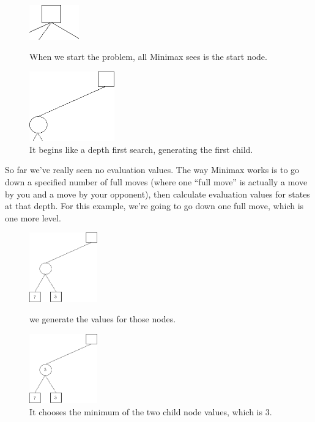 \begin{figure}[H]
\centering
	\begin{minipage}[b]{0.45\linewidth}
		\centering
		\includegraphics[height=1.5cm]{2_State_of_the_art/Arimaa_on_MCTS_Benoit/img/Minimax2.png}
		\caption{\label{fig:Minimax2}When we start the problem, all Minimax sees is the start node.}
	\end{minipage}%
	\hspace*{1cm}
	\begin{minipage}[b]{0.45\linewidth}
		\centering
		\includegraphics[height=3cm]{2_State_of_the_art/Arimaa_on_MCTS_Benoit/img/Minimax3.png}
		\caption{\label{fig:Minimax3}It begins like a depth first search, generating the first child.}
	\end{minipage}%
\end{figure}

\noindent
So far we've really seen no evaluation values. The way Minimax works is to go down a specified number of full moves (where one ``full move'' is actually a move by you and a move by your opponent), then calculate evaluation values for states at that depth. For this example, we're going to go down one full move, which is one more level. 
\begin{figure}[H]
\centering
	\begin{minipage}[b]{0.45\linewidth}
		\centering
		\includegraphics[height=3cm]{2_State_of_the_art/Arimaa_on_MCTS_Benoit/img/Minimax4.png}
		\caption{\label{fig:Minimax4}we generate the values for those nodes.}
	\end{minipage}%
	\hspace*{1cm}
	\begin{minipage}[b]{0.45\linewidth}
		\centering
		\includegraphics[height=3cm]{2_State_of_the_art/Arimaa_on_MCTS_Benoit/img/Minimax5.png}
		\caption{\label{fig:Minimax5}It chooses the minimum of the two child node values, which is 3.}
	\end{minipage}%
\end{figure}

